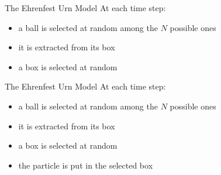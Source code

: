   \begin{frame}{The Ehrenfest Urn Model} %
    At each time step:
    \begin{itemize}
      \item a ball is selected at random among the $N$ possible ones
      \item it is extracted from its box
      \item \alert{a box is selected at random}
    \end{itemize}

    \medskip
    \begin{figure}[b]
      \begin{center}
        
      \end{center}
    \end{figure}
  \end{frame}

  \begin{frame}{The Ehrenfest Urn Model} %
    At each time step:
    \begin{itemize}
      \item a ball is selected at random among the $N$ possible ones
      \item it is extracted from its box
      \item a box is selected at random
      \item \alert{the particle is put in the selected box}
    \end{itemize}

    \medskip
    \begin{figure}[b]
      \begin{center}
        
      \end{center}
    \end{figure}
  \end{frame}